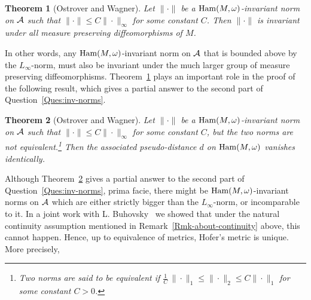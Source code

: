 \documentclass{icmart}
\newtheorem{theorem}{Theorem}[section]
\theoremstyle{definition}
\begin{document}
\begin{theorem}[Ostrover and Wagner] \label{Ham-invariant-implies-measure-invarinat}
Let $ \| \cdot \|$ be a ${\rm Ham}(M,\omega)$-invariant norm on ${\cal
A}$ such that $\| \cdot \| \leq C \| \cdot \|_{\infty}$ for some
constant $C$. Then $\| \cdot \|$ is invariant under all measure
preserving diffeomorphisms of $M$.
\end{theorem}
In other words, any ${\rm Ham}(M,\omega)$-invariant  norm on  ${\cal A}$ that is bounded above by the $L_{\infty}$-norm, must also be invariant  under the much larger group of measure preserving diffeomorphisms. 
%
%
Theorem~\ref{Ham-invariant-implies-measure-invarinat} plays an important role in the proof of the following result, which gives a partial answer to the second part of  Question~\ref{Ques:inv-norms}.
\begin{theorem}[Ostrover and Wagner] \label{OW-theorem}
Let $ \| \cdot \|$ be a ${\rm Ham}(M,\omega)$-invariant norm on ${\cal A}$
such that $\| \cdot \| \leq C\| \cdot \|_{\infty}$ for some constant
$C$, but the two norms are not equivalent.\footnote{Two norms are said to be equivalent
 if  ${\frac 1 C} \, \| \cdot \|_1 \leqslant \| \cdot \|_2 \leqslant C \| \cdot \|_1$ for some constant $C>0$.}
%
Then the associated
pseudo-distance $d$ on ${\rm  Ham}(M,\omega)$ vanishes identically.
\end{theorem}
Although Theorem~\ref{OW-theorem} gives a partial answer to the second part of  Question~\ref{Ques:inv-norms}, prima facie, there might be ${\rm  Ham}(M,\omega)$-invariant norms on ${\cal A}$  which  are either strictly bigger than the $L_{\infty}$-norm, or  incomparable to it.
In a joint work with L. Buhovsky~\cite{BO} we showed that under the natural continuity assumption mentioned in Remark~\ref{Rmk-about-continuity} above, this cannot happen. Hence, up to equivalence of metrics,  Hofer's metric is unique. More precisely, 
%
%
%
\end{document}
